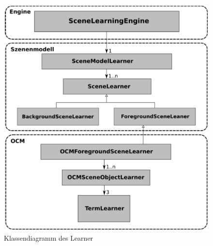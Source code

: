 \begin{deprecated}
\cite{gehrung14}
\end{deprecated}
\begin{figure}
	\centering
	\includegraphics[width=15cm]{bilder/LearnerClass.pdf}
	\caption{Klassendiagramm des Learner}
	\label{img:learnerclass}
\end{figure}
